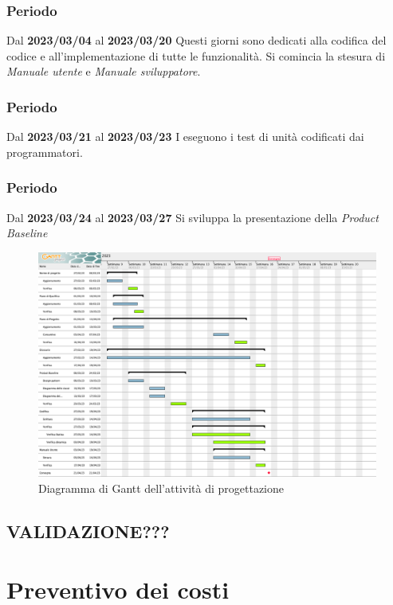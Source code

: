 \subsubsection{ Periodo}
Dal \textbf{2023/03/04} al \textbf{2023/03/20}
\newline
Questi giorni sono dedicati alla codifica del codice e all'implementazione di tutte le funzionalità. Si comincia la stesura di 
\textit{Manuale utente} e \textit{Manuale sviluppatore}.
\subsubsection{ Periodo}
Dal \textbf{2023/03/21} al \textbf{2023/03/23}
\newline
I eseguono i test di unità codificati dai programmatori.
\subsubsection{ Periodo}
Dal \textbf{2023/03/24} al \textbf{2023/03/27}
\newline
Si sviluppa la presentazione della \textit{Product Baseline}

\begin{figure}[H]
    \centering
    \includegraphics[scale=0.32]{src/img/Gantt progettazione.png}
    \caption{Diagramma di Gantt dell'attività di progettazione}
\end{figure}

\subsection{VALIDAZIONE???}

\section{Preventivo dei costi}

